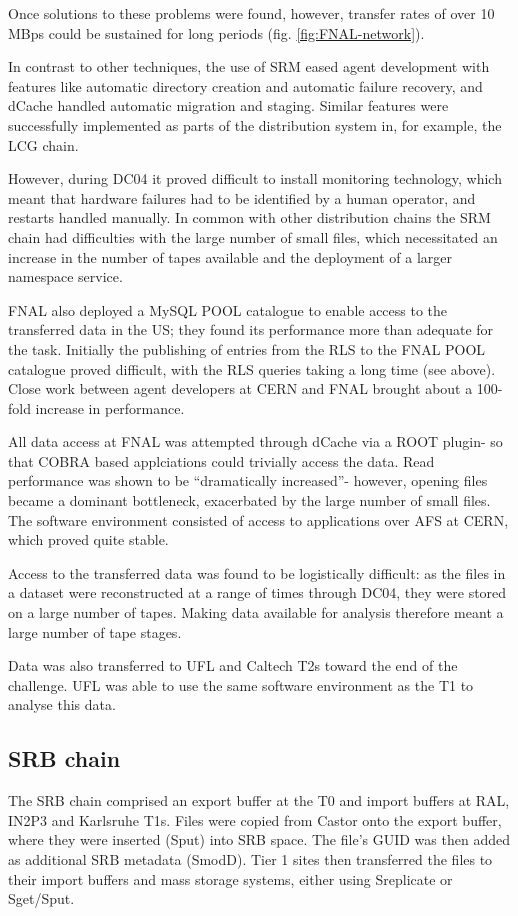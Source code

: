 \documentclass{cmspaper}
\begin{document}
Once solutions to these problems were found, however, transfer rates
of over 10 MBps could be sustained for long periods
(fig. \ref{fig:FNAL-network}).

In contrast to other techniques, the use of SRM eased agent
development with features like automatic directory creation and
automatic failure recovery, and dCache handled automatic migration and
staging. Similar features were successfully implemented as parts of
the distribution system in, for example, the LCG chain.

However, during DC04 it proved difficult to install monitoring
technology, which meant that hardware failures had to be identified by
a human operator, and restarts handled manually. In common with other
distribution chains the SRM chain had difficulties with the large
number of small files, which necessitated an increase in the number of
tapes available and the deployment of a larger namespace service.

FNAL also deployed a MySQL POOL catalogue to enable access to the
transferred data in the US; they found its performance more than
adequate for the task. Initially the publishing of entries from the
RLS to the FNAL POOL catalogue proved difficult, with the RLS queries
taking a long time (see above). Close work between agent developers at
CERN and FNAL brought about a 100-fold increase in performance.

All data access at FNAL was attempted through dCache via a ROOT
plugin- so that COBRA based applciations could trivially access the
data. Read performance was shown to be ``dramatically increased''-
however, opening files became a dominant bottleneck, exacerbated by
the large number of small files. The software environment consisted of
access to applications over AFS at CERN, which proved quite stable.

Access to the transferred data was found to be logistically difficult:
as the files in a dataset were reconstructed at a range of times
through DC04, they were stored on a large number of tapes. Making data
available for analysis therefore meant a large number of tape stages.

Data was also transferred to UFL and Caltech T2s toward the end of the
challenge. UFL was able to use the same software environment as the T1
to analyse this data.

\subsection{SRB chain}
The SRB chain comprised an export buffer at the T0 and import buffers at RAL, IN2P3 and Karlsruhe T1s. Files were copied from Castor onto the export buffer, where they were inserted (Sput) into SRB space. The file's GUID was then added as additional SRB metadata (SmodD). Tier 1 sites then transferred the files to their import buffers and mass storage systems, either using Sreplicate or Sget/Sput.
\end{document}
